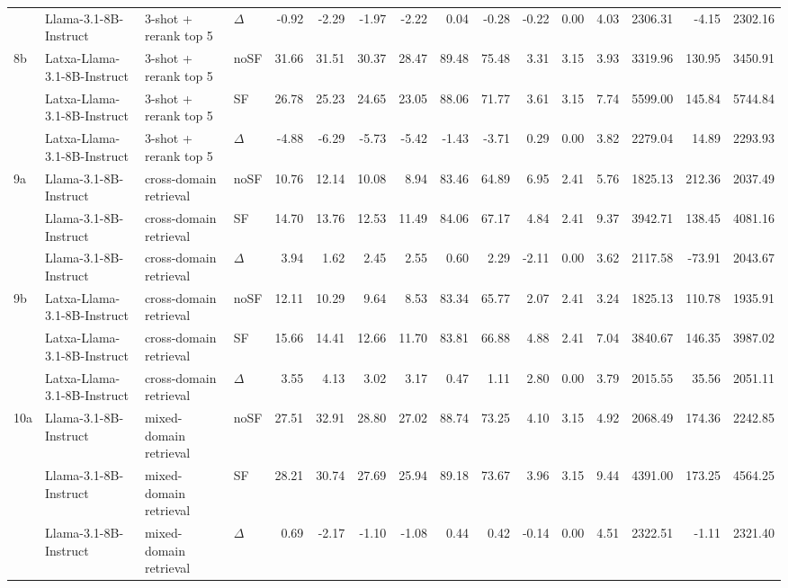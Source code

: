 \begin{landscape}
\begin{footnotesize}
\begin{longtable}{l l l l r r r r r r r r r r r r}
 & Llama-3.1-8B-Instruct & 3-shot + rerank top 5 & $\Delta$ & -0.92 & -2.29 & -1.97 & -2.22 & 0.04 & -0.28 & -0.22 & 0.00 & 4.03 & 2306.31 & -4.15 & 2302.16 \\
\rowcolor{tabhighlight}\textrightarrow{} 8b & Latxa-Llama-3.1-8B-Instruct & 3-shot + rerank top 5 & noSF & 31.66 & 31.51 & 30.37 & 28.47 & 89.48 & 75.48 & 3.31 & 3.15 & 3.93 & 3319.96 & 130.95 & 3450.91 \\
 & Latxa-Llama-3.1-8B-Instruct & 3-shot + rerank top 5 & SF & 26.78 & 25.23 & 24.65 & 23.05 & 88.06 & 71.77 & 3.61 & 3.15 & 7.74 & 5599.00 & 145.84 & 5744.84 \\
 & Latxa-Llama-3.1-8B-Instruct & 3-shot + rerank top 5 & $\Delta$ & -4.88 & -6.29 & -5.73 & -5.42 & -1.43 & -3.71 & 0.29 & 0.00 & 3.82 & 2279.04 & 14.89 & 2293.93 \\
\midrule
9a & Llama-3.1-8B-Instruct & cross-domain retrieval & noSF & 10.76 & 12.14 & 10.08 & 8.94 & 83.46 & 64.89 & 6.95 & 2.41 & 5.76 & 1825.13 & 212.36 & 2037.49 \\
 & Llama-3.1-8B-Instruct & cross-domain retrieval & SF & 14.70 & 13.76 & 12.53 & 11.49 & 84.06 & 67.17 & 4.84 & 2.41 & 9.37 & 3942.71 & 138.45 & 4081.16 \\
 & Llama-3.1-8B-Instruct & cross-domain retrieval & $\Delta$ & 3.94 & 1.62 & 2.45 & 2.55 & 0.60 & 2.29 & -2.11 & 0.00 & 3.62 & 2117.58 & -73.91 & 2043.67 \\
9b & Latxa-Llama-3.1-8B-Instruct & cross-domain retrieval & noSF & 12.11 & 10.29 & 9.64 & 8.53 & 83.34 & 65.77 & 2.07 & 2.41 & 3.24 & 1825.13 & 110.78 & 1935.91 \\
 & Latxa-Llama-3.1-8B-Instruct & cross-domain retrieval & SF & 15.66 & 14.41 & 12.66 & 11.70 & 83.81 & 66.88 & 4.88 & 2.41 & 7.04 & 3840.67 & 146.35 & 3987.02 \\
 & Latxa-Llama-3.1-8B-Instruct & cross-domain retrieval & $\Delta$ & 3.55 & 4.13 & 3.02 & 3.17 & 0.47 & 1.11 & 2.80 & 0.00 & 3.79 & 2015.55 & 35.56 & 2051.11 \\
\midrule
10a & Llama-3.1-8B-Instruct & mixed-domain retrieval & noSF & 27.51 & 32.91 & 28.80 & 27.02 & 88.74 & 73.25 & 4.10 & 3.15 & 4.92 & 2068.49 & 174.36 & 2242.85 \\
 & Llama-3.1-8B-Instruct & mixed-domain retrieval & SF & 28.21 & 30.74 & 27.69 & 25.94 & 89.18 & 73.67 & 3.96 & 3.15 & 9.44 & 4391.00 & 173.25 & 4564.25 \\
 & Llama-3.1-8B-Instruct & mixed-domain retrieval & $\Delta$ & 0.69 & -2.17 & -1.10 & -1.08 & 0.44 & 0.42 & -0.14 & 0.00 & 4.51 & 2322.51 & -1.11 & 2321.40 \\

\end{longtable}
\end{footnotesize}
\end{landscape}

